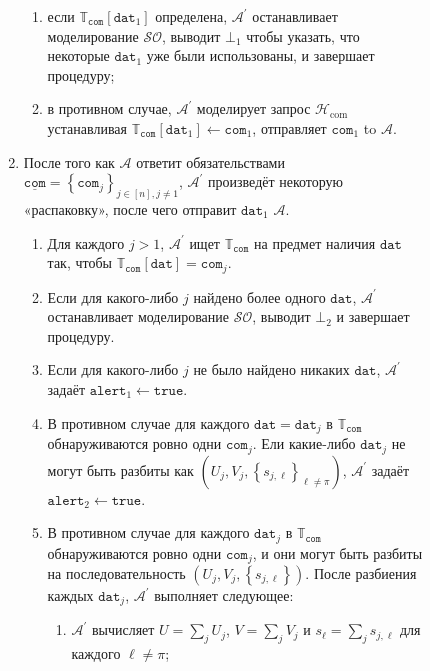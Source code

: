 \documentclass{mrl}
\theoremstyle{definition}
\numberwithin{theorem}{subsection}
\newcommand{\adversary}{\mathcal{A}}
\begin{document}
\begin{description}
\begin{description}
\begin{enumerate}
\begin{enumerate}
\item если $\mathbb{T}_{\texttt{com}}[\texttt{dat}_1]$ определена, $\adversary^\prime$ останавливает моделирование $\mathcal{SO}$, выводит $\bot_1$ чтобы указать, что некоторые $\texttt{dat}_1$ уже были использованы, и завершает процедуру;

\item в противном случае, $\adversary^\prime$ моделирует запрос $\mathcal{H}_{\text{com}}$ устанавливая $\mathbb{T}_{\texttt{com}}\left[\texttt{dat}_1\right] \leftarrow \texttt{com}_1$, отправляет $\texttt{com}_1$ to $\adversary$.


\end{enumerate}

\item После того как $\adversary$ ответит обязательствами $\underline{\texttt{com}} = \left\{\texttt{com}_j\right\}_{j \in [n], j \neq 1}$, $\adversary^\prime$ произведёт некоторую «распаковку», после чего отправит $\texttt{dat}_1$ $\adversary$.
\begin{enumerate}
\item Для каждого $j > 1$, $\adversary^\prime$ ищет $\mathbb{T}_{\texttt{com}}$ на предмет наличия $\texttt{dat}$ так, чтобы $\mathbb{T}_{\texttt{com}}\left[\texttt{dat}\right] = \texttt{com}_j$.

\item Если для какого-либо $j$ найдено более одного $\texttt{dat}$, $\adversary^\prime$ останавливает моделирование $\mathcal{SO}$, выводит $\bot_2$ и завершает процедуру.

\item Если для какого-либо $j$ не было найдено никаких $\texttt{dat}$, $\adversary^\prime$ задаёт $\texttt{alert}_1 \leftarrow \texttt{true}$.

\item \label{gather} В противном случае для каждого $\texttt{dat} = \texttt{dat}_j$ в $\mathbb{T}_{\texttt{com}}$ обнаруживаются ровно одни $\texttt{com}_j$. Ели какие-либо $\texttt{dat}_j$ не могут быть разбиты как $(U_j, V_j, \left\{s_{j, \ell}\right\}_{\ell \neq \pi})$, $\adversary^\prime$ задаёт $\texttt{alert}_2 \leftarrow \texttt{true}$.


\item В противном случае для каждого $\texttt{dat}_j$ в $\mathbb{T}_{\texttt{com}}$ обнаруживаются ровно одни $\texttt{com}_j$, и они могут быть разбиты на последовательность $(U_j, V_j, \left\{s_{j,\ell}\right\})$. После разбиения каждых $\texttt{dat}_j$, $\adversary^\prime$ выполняет следующее:
\begin{enumerate}
\item $\adversary^\prime$ вычисляет $U = \sum_j U_j$, $V = \sum_j V_j$ и $s_\ell = \sum_j s_{j,\ell}$ для каждого $\ell \neq \pi$;


\end{enumerate}
\end{enumerate}
\end{enumerate}
\end{description}
\end{description}
\end{document}
